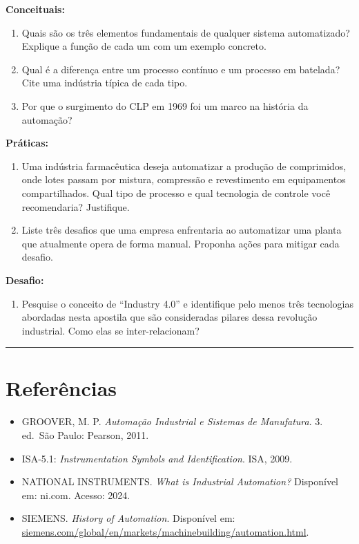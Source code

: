 \textbf{Conceituais:}

\begin{enumerate}
\def\labelenumi{\arabic{enumi}.}
\tightlist
\item
  Quais são os três elementos fundamentais de qualquer sistema automatizado? Explique a função de cada um com um exemplo concreto.
\item
  Qual é a diferença entre um processo contínuo e um processo em batelada? Cite uma indústria típica de cada tipo.
\item
  Por que o surgimento do CLP em 1969 foi um marco na história da automação?
\end{enumerate}

\textbf{Práticas:}

\begin{enumerate}
\def\labelenumi{\arabic{enumi}.}
\setcounter{enumi}{3}
\tightlist
\item
  Uma indústria farmacêutica deseja automatizar a produção de comprimidos, onde lotes passam por mistura, compressão e revestimento em equipamentos compartilhados. Qual tipo de processo e qual tecnologia de controle você recomendaria? Justifique.
\item
  Liste três desafios que uma empresa enfrentaria ao automatizar uma planta que atualmente opera de forma manual. Proponha ações para mitigar cada desafio.
\end{enumerate}

\textbf{Desafio:}

\begin{enumerate}
\def\labelenumi{\arabic{enumi}.}
\setcounter{enumi}{5}
\tightlist
\item
  Pesquise o conceito de ``Industry 4.0'' e identifique pelo menos três tecnologias abordadas nesta apostila que são consideradas pilares dessa revolução industrial. Como elas se inter-relacionam?
\end{enumerate}

\begin{center}\rule{0.5\linewidth}{0.5pt}\end{center}

\section{Referências}\label{referuxeancias}

\begin{itemize}
\tightlist
\item
  GROOVER, M. P. \emph{Automação Industrial e Sistemas de Manufatura}. 3. ed.~São Paulo: Pearson, 2011.
\item
  ISA-5.1: \emph{Instrumentation Symbols and Identification}. ISA, 2009.
\item
  NATIONAL INSTRUMENTS. \emph{What is Industrial Automation?} Disponível em: ni.com. Acesso: 2024.
\item
  SIEMENS. \emph{History of Automation}. Disponível em: \url{siemens.com/global/en/markets/machinebuilding/automation.html}.
\end{itemize}
